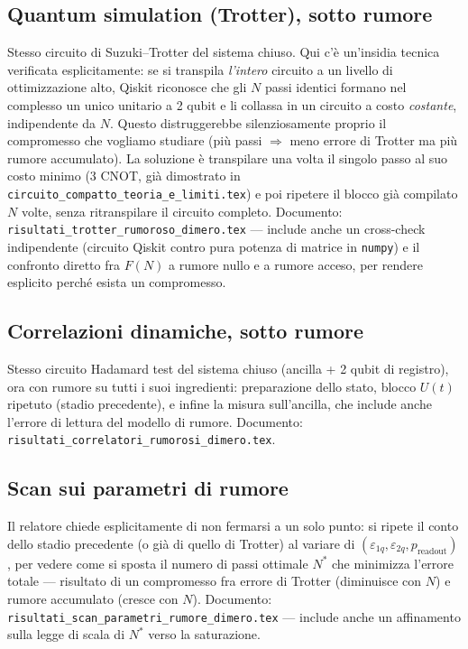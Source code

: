 \documentclass[11pt,a4paper]{article}
\begin{document}
\subsection{Quantum simulation (Trotter), sotto rumore}
\label{subsec:trotter}

Stesso circuito di Suzuki--Trotter del sistema chiuso. Qui c'è
un'insidia tecnica verificata esplicitamente: se si transpila
\emph{l'intero} circuito a un livello di ottimizzazione alto, Qiskit
riconosce che gli $N$ passi identici formano nel complesso un unico
unitario a 2 qubit e li collassa in un circuito a costo
\emph{costante}, indipendente da $N$. Questo distruggerebbe
silenziosamente proprio il compromesso che vogliamo studiare (più passi
$\Rightarrow$ meno errore di Trotter ma più rumore accumulato). La
soluzione è transpilare una volta il singolo passo al suo costo minimo
(3 CNOT, già dimostrato in
\texttt{circuito\_compatto\_teoria\_e\_limiti.tex}) e poi ripetere il
blocco già compilato $N$ volte, senza ritranspilare il circuito
completo. Documento: \texttt{risultati\_trotter\_rumoroso\_dimero.tex}
--- include anche un cross-check indipendente (circuito Qiskit contro
pura potenza di matrice in \texttt{numpy}) e il confronto diretto fra
$F(N)$ a rumore nullo e a rumore acceso, per rendere esplicito perché
esista un compromesso.

\subsection{Correlazioni dinamiche, sotto rumore}

Stesso circuito Hadamard test del sistema chiuso (ancilla + 2 qubit di
registro), ora con rumore su tutti i suoi ingredienti: preparazione
dello stato, blocco $U(t)$ ripetuto (stadio precedente), e infine la
misura sull'ancilla, che include anche l'errore di lettura del modello
di rumore. Documento:
\texttt{risultati\_correlatori\_rumorosi\_dimero.tex}.

\subsection{Scan sui parametri di rumore}

Il relatore chiede esplicitamente di non fermarsi a un solo punto: si
ripete il conto dello stadio precedente (o già di quello di Trotter) al
variare di $(\varepsilon_{1q},\varepsilon_{2q},p_\text{readout})$, per
vedere come si sposta il numero di passi ottimale $N^*$ che minimizza
l'errore totale --- risultato di un compromesso fra errore di Trotter
(diminuisce con $N$) e rumore accumulato (cresce con $N$). Documento:
\texttt{risultati\_scan\_parametri\_rumore\_dimero.tex} --- include anche
un affinamento sulla legge di scala di $N^*$ verso la saturazione.
\end{document}
